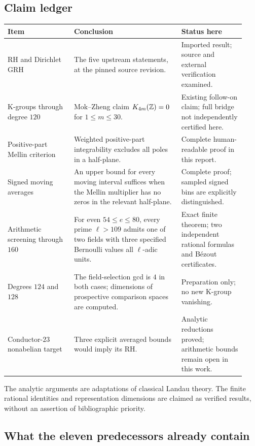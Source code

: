\subsection{Claim ledger}

\begin{longtable}{@{}P{0.26\linewidth}P{0.42\linewidth}P{0.25\linewidth}@{}}
\toprule
Item & Conclusion & Status here\\
\midrule
\endhead
RH and Dirichlet GRH &
The five upstream statements, at the pinned source revision. &
Imported result; source and external verification examined.\\[5pt]
K-groups through degree $120$ &
Mok--Zheng claim $K_{4m}(\mathbb Z)=0$ for $1\le m\le30$. &
Existing follow-on claim; full bridge not independently certified here.\\[5pt]
Positive-part Mellin criterion &
Weighted positive-part integrability excludes all poles in a half-plane. &
Complete human-readable proof in this report.\\[5pt]
Signed moving averages &
An upper bound for every moving interval suffices when the Mellin multiplier
has no zeros in the relevant half-plane. &
Complete proof; sampled signed bins are explicitly distinguished.\\[5pt]
Arithmetic screening through $160$ &
For even $54\le e\le80$, every prime $\ell>109$ admits one of two fields
with three specified Bernoulli values all $\ell$-adic units. &
Exact finite theorem; two independent rational formulas and B\'ezout
certificates.\\[5pt]
Degrees $124$ and $128$ &
The field-selection gcd is $4$ in both cases; dimensions of prospective
comparison spaces are computed. &
Preparation only; no new K-group vanishing.\\[5pt]
Conductor-$23$ nonabelian target &
Three explicit averaged bounds would imply its RH. &
Analytic reductions proved; arithmetic bounds remain open in this work.\\
\bottomrule
\end{longtable}

The analytic arguments are adaptations of classical Landau theory.
The finite rational identities and representation dimensions are claimed
as verified results, without an assertion of bibliographic priority.

\subsection{What the eleven predecessors already contain}

